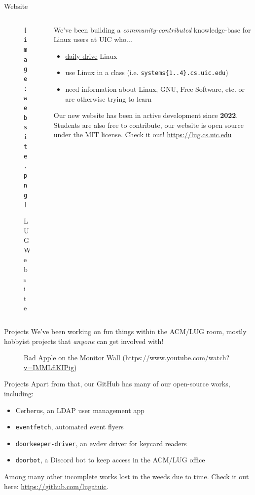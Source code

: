 \documentclass{beamer}
\begin{document}
\begin{frame}{Website}
	\begin{columns}
		\begin{column}{0.4\textwidth}
			\begin{figure}
				\centering
				\texttt{[image: website.png]}
				\caption{LUG Website}
			\end{figure}
		\end{column}
		\begin{column}{0.6\textwidth}
			We've been building a \textit{community-contributed}
			knowledge-base for Linux users at UIC who...
			\pause
			\begin{itemize}
				\item \underline{daily-drive} Linux
				\pause
				\item use Linux in a class (i.e.
					\texttt{systems\{1..4\}.cs.uic.edu})
					\pause
				\item need information about Linux, GNU, Free
					Software, etc. or are otherwise trying
					to learn
					\pause
			\end{itemize}
			Our new website has been in active development since
			\textbf{2022}. Students are also free to contribute,
			our website is open source under the MIT license. Check
			it out! \url{https://lug.cs.uic.edu}
		\end{column}
	\end{columns}
\end{frame}

\begin{frame}{Projects}
	We've been working on fun things within the ACM/LUG room, mostly
	hobbyist projects that \textit{anyone} can get involved with!
	\pause
	\begin{figure}
		\centering
		\caption{Bad Apple on the Monitor Wall
		(\url{https://www.youtube.com/watch?v=IMMLflKIPig})}
	\end{figure}
\end{frame}

\begin{frame}{Projects}
	Apart from that, our GitHub has many of our open-source works,
	including:
	\pause
	\begin{itemize}
		\item Cerberus, an LDAP user management app
			\pause
		\item \texttt{eventfetch}, automated event flyers
			\pause
		\item \texttt{doorkeeper-driver}, an evdev driver for keycard
			readers
			\pause
		\item \texttt{doorbot}, a Discord bot to keep access in the
			ACM/LUG office
			\pause
	\end{itemize}
	Among many other incomplete works lost in the weeds due to time. Check
	it out here: \url{https://github.com/lugatuic}.
\end{frame}
\end{document}
